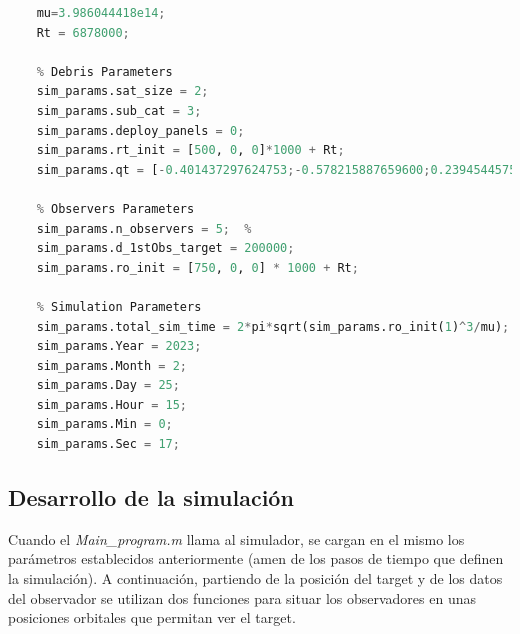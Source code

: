 \begin{lstlisting}[language=Python, caption= Parámetros introducidos al programa principalen el \textit{Sim\_config.m}.]
    % Global Constants
    mu=3.986044418e14;
    Rt = 6878000;
    
    % Debris Parameters
    sim_params.sat_size = 2;   
    sim_params.sub_cat = 3;    
    sim_params.deploy_panels = 0;   
    sim_params.rt_init = [500, 0, 0]*1000 + Rt;
    sim_params.qt = [-0.401437297624753;-0.578215887659600;0.239454457519217;0.668712229668289];
    
    % Observers Parameters
    sim_params.n_observers = 5;  %
    sim_params.d_1stObs_target = 200000;
    sim_params.ro_init = [750, 0, 0] * 1000 + Rt;
    
    % Simulation Parameters
    sim_params.total_sim_time = 2*pi*sqrt(sim_params.ro_init(1)^3/mu);   
    sim_params.Year = 2023;
    sim_params.Month = 2;
    sim_params.Day = 25;
    sim_params.Hour = 15;
    sim_params.Min = 0;
    sim_params.Sec = 17;
\end{lstlisting}



\subsection{Desarrollo de la simulación}
Cuando el \textit{Main\_program.m} llama al simulador, se cargan en el mismo los parámetros establecidos anteriormente (amen de los pasos de tiempo que definen la simulación). A continuación, partiendo de la posición del target y de los datos del observador se utilizan dos funciones para situar los observadores en unas posiciones orbitales que permitan ver el target. 


